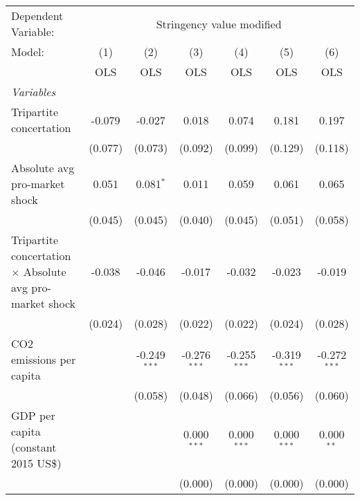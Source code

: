 
\begingroup
\centering
\begin{tabular}{lcccccc}
   \toprule
   Dependent Variable: & \multicolumn{6}{c}{Stringency value modified}\\
   Model:                                                          & (1)     & (2)            & (3)            & (4)            & (5)            & (6)\\  
                                                                   &  OLS    & OLS            & OLS            & OLS            & OLS            & OLS\\  
   \midrule
   \emph{Variables}\\
   Tripartite concertation                                         & -0.079  & -0.027         & 0.018          & 0.074          & 0.181          & 0.197\\   
                                                                   & (0.077) & (0.073)        & (0.092)        & (0.099)        & (0.129)        & (0.118)\\   
   Absolute avg pro-market shock                                   & 0.051   & 0.081$^{*}$    & 0.011          & 0.059          & 0.061          & 0.065\\   
                                                                   & (0.045) & (0.045)        & (0.040)        & (0.045)        & (0.051)        & (0.058)\\   
   Tripartite concertation $\times$ Absolute avg pro-market shock  & -0.038  & -0.046         & -0.017         & -0.032         & -0.023         & -0.019\\   
                                                                   & (0.024) & (0.028)        & (0.022)        & (0.022)        & (0.024)        & (0.028)\\   
   CO2 emissions per capita                                        &         & -0.249$^{***}$ & -0.276$^{***}$ & -0.255$^{***}$ & -0.319$^{***}$ & -0.272$^{***}$\\   
                                                                   &         & (0.058)        & (0.048)        & (0.066)        & (0.056)        & (0.060)\\   
   GDP per capita (constant 2015 US\$)                             &         &                & 0.000$^{***}$  & 0.000$^{***}$  & 0.000$^{***}$  & 0.000$^{**}$\\   
                                                                   &         &                & (0.000)        & (0.000)        & (0.000)        & (0.000)\\   

\end{tabular}
